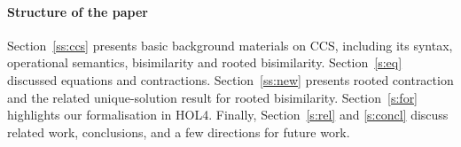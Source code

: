 \paragraph{Structure of the paper} 
Section~\ref{ss:ccs} presents basic background materials on CCS,
including its syntax, operational semantics, bisimilarity and rooted
bisimilarity. Section~\ref{s:eq} discussed equations and contractions.
 Section~\ref{ss:new} presents rooted contraction and the related
 unique-solution result for rooted bisimilarity. Section~\ref{s:for}
 highlights our formalisation in HOL4. Finally,  Section~\ref{s:rel} and
 \ref{s:concl} discuss related work, conclusions,  and  a few
 directions for future work.

 